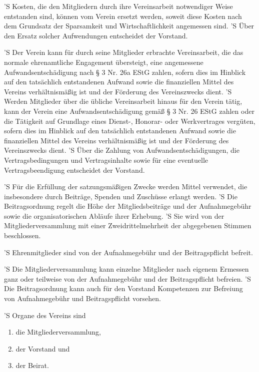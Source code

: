 \documentclass[a4paper,10pt]{scrreprt}
\begin{document}
\begin{contract}
'S Kosten, die den Mitgliedern durch ihre Vereinsarbeit notwendiger Weise
entstanden sind, können vom Verein ersetzt werden, soweit diese Kosten nach dem
Grundsatz der Sparsamkeit und Wirtschaftlichkeit angemessen sind.
'S Über den Ersatz solcher Aufwendungen entscheidet der Vorstand.

'S Der Verein kann für durch seine Mitglieder erbrachte Vereinsarbeit, die das
normale ehrenamtliche Engagement übersteigt, eine angemessene
Aufwandsentschädigung nach § 3 Nr. 26a EStG zahlen, sofern dies im Hinblick auf
den tatsächlich entstandenen Aufwand sowie die finanziellen Mittel des Vereins
verhältnismäßig ist und der Förderung des Vereinszwecks dient.
'S Werden Mitglieder über die übliche Vereinsarbeit hinaus für den Verein
tätig, kann der Verein eine Aufwandsentschädigung gemäß § 3 Nr. 26 EStG zahlen
oder die Tätigkeit auf Grundlage eines Dienst-, Honorar- oder Werkvertrages
vergüten, sofern dies im Hinblick auf den tatsächlich entstandenen Aufwand
sowie die finanziellen Mittel des Vereins verhältnismäßig ist und der Förderung
des Vereinszwecks dient.
'S Über die Zahlung von Aufwandsentschädigungen, die Vertragsbedingungen und
Vertragsinhalte sowie für eine eventuelle Vertragsbeendigung entscheidet der
Vorstand.


'S Für die Erfüllung der satzungsmäßigen Zwecke werden Mittel verwendet, die
insbesondere durch Beiträge, Spenden und Zuschüsse erlangt werden.
'S Die Beitragsordnung regelt die Höhe der Mitgliedsbeiträge und der
Aufnahmegebühr sowie die organisatorischen Abläufe ihrer Erhebung.
'S Sie wird von der Mitgliederversammlung mit einer Zweidrittelmehrheit der
abgegebenen Stimmen beschlossen.

'S Ehrenmitglieder sind von der Aufnahmegebühr und der Beitragspflicht befreit.

'S Die Mitgliederversammlung kann einzelne Mitglieder nach eigenem Ermessen
ganz oder teilweise von der Aufnahmegebühr und der Beitragspflicht befreien.
'S Die Beitragsordnung kann auch für den Vorstand Kompetenzen zur Befreiung von
Aufnahmegebühr und Beitragspflicht vorsehen.


'S Organe des Vereins sind
\begin{enumerate}
	\item die Mitgliederversammlung,
	\item der Vorstand und
	\item der Beirat.
\end{enumerate}


\end{contract}
\end{document}
